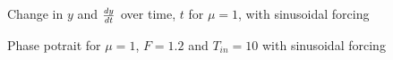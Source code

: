 \documentclass{article}
\begin{document}
\begin{figure}[H]
\centering 
\noindent{}%
\caption{Change in $y$ and $dy \over dt$  over time, $t$ for $\mu=1$, with sinusoidal forcing}
\end{figure}
\begin{figure}[H]
\centering 
\noindent{}%
\caption{Phase potrait for $\mu=1$, $F=1.2$ and $T_{in}=10$ with sinusoidal forcing}
\end{figure}
\end{document}
